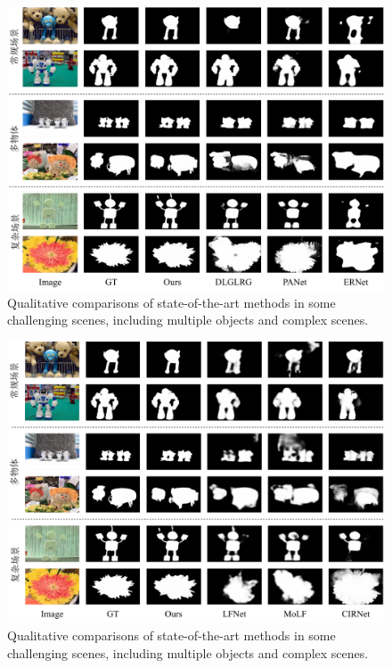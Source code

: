 \begin{figure}
	\centering
	\includegraphics[width=\linewidth]{figures/chapter3/compare_1}
	\caption{
		Qualitative comparisons of state-of-the-art methods in some challenging scenes, including multiple objects and complex scenes.
	}
	\label{figure:figure_comparison_1}
	\vspace{-0.2cm}
\end{figure}


\begin{figure}
	\centering
	\includegraphics[width=\linewidth]{figures/chapter3/compare_2}
	\caption{
		Qualitative comparisons of state-of-the-art methods in some challenging scenes, including multiple objects and complex scenes.
	}
	\label{figure:figure_comparison_2}
	\vspace{-0.2cm}
\end{figure}

